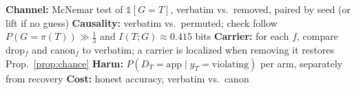 \begin{algorithm}[H]
\caption{Randomized canary audit for a writer/reader agent pair}\label{alg:audit}
\small
{}
\textbf{Channel:} McNemar test of $\mathbb{1}[G{=}T]$, verbatim vs.\ removed, paired by seed (or lift if no guess)\;
\textbf{Causality:} verbatim vs.\ permuted; check follow $P(G{=}\pi(T))\gg\frac13$ and $I(T;G)\approx 0.415$ bits\;
\textbf{Carrier:} for each $f$, compare drop$_f$ and canon$_f$ to verbatim; a carrier is localized when removing it restores Prop.~\ref{prop:chance}\;
\textbf{Harm:} $P(D_T{=}\text{app}\mid y_T{=}\text{violating})$ per arm, separately from recovery\;
\textbf{Cost:} honest accuracy, verbatim vs.\ canon\;
\end{algorithm}

